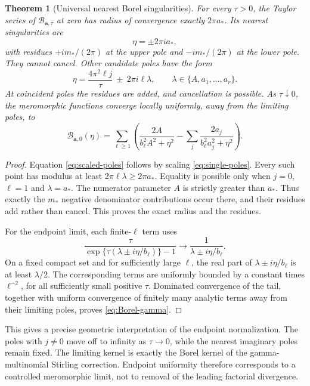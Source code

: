 \documentclass[11pt,a4paper]{article}
\numberwithin{equation}{section}
\newtheorem{theorem}{Theorem}[section]
\theoremstyle{definition}\newtheorem{definition}[theorem]{Definition}
\theoremstyle{remark}\newtheorem{remark}[theorem]{Remark}
\newcommand{\avec}{\boldsymbol a}
\newcommand{\amin}{a_*}
\newcommand{\mmin}{m_*}
\newcommand{\calB}{\mathscr B}
\begin{document}
\begin{theorem}[Universal nearest Borel singularities]
\label{thm:nearest}
For every $\tau>0$, the Taylor series of $\calB_{\avec,\tau}$ at zero has
radius of convergence exactly $2\pi\amin$. Its nearest singularities are
\begin{equation}
 \eta=\pm2\pi i\amin,
 \label{eq:nearest}
\end{equation}
with residues $+i\mmin/(2\pi)$ at the upper pole and $-i\mmin/(2\pi)$ at the
lower pole. They cannot cancel.
Other candidate poles have the form
\begin{equation}
 \eta=\frac{4\pi^2\ell j}{\tau}\ \pm\ 2\pi i\ell\lambda,
 \qquad \lambda\in\{A,a_1,\ldots,a_r\}.
 \label{eq:scaled-poles}
\end{equation}
At coincident poles the residues are added, and cancellation is possible.
As $\tau\downarrow0$, the meromorphic functions converge locally uniformly,
away from the limiting poles, to
\begin{equation}
 \calB_{\avec,0}(\eta)=\sum_{\ell\ge1}
 \left(\frac{2A}{b_\ell^2A^2+\eta^2}
           -\sum_j\frac{2a_j}{b_\ell^2a_j^2+\eta^2}\right).
 \label{eq:Borel-gamma}
\end{equation}
\end{theorem}
\begin{proof}
Equation \eqref{eq:scaled-poles} follows by scaling
\eqref{eq:single-poles}. Every such point has modulus at least
$2\pi\ell\lambda\ge2\pi\amin$. Equality is possible only when $j=0$,
$\ell=1$ and $\lambda=\amin$. The numerator parameter $A$ is strictly greater
than $\amin$. Thus exactly the $\mmin$ negative denominator contributions
occur there, and their residues add rather than cancel. This proves the exact
radius and the residues.

For the endpoint limit, each finite-$\ell$ term uses
\[
 \frac{\tau}{\exp\{\tau(\lambda\pm i\eta/b_\ell)\}-1}
       \longrightarrow\frac1{\lambda\pm i\eta/b_\ell}.
\]
On a fixed compact set and for sufficiently large $\ell$, the real part of
$\lambda\pm i\eta/b_\ell$ is at least $\lambda/2$. The corresponding terms
are uniformly bounded by a constant times $\ell^{-2}$, for all sufficiently
small positive $\tau$. Dominated convergence of the tail, together with
uniform convergence of finitely many analytic terms away from their limiting
poles, proves \eqref{eq:Borel-gamma}.
\end{proof}

This gives a precise geometric interpretation of the endpoint normalization.
The poles with $j\ne0$ move off to infinity as $\tau\to0$, while the nearest
imaginary poles remain fixed. The limiting kernel is exactly the Borel kernel
of the gamma-multinomial Stirling correction. Endpoint uniformity therefore
corresponds to a controlled meromorphic limit, not to removal of the leading
factorial divergence.
\end{document}
